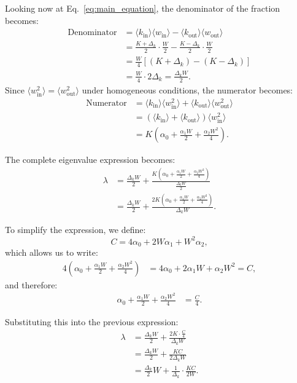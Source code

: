 \documentclass[a4paper,pre,superscriptaddress,floatfix,nofootinbib,twocolumn]{revtex4-1}
\begin{document}
Looking now at Eq.~\eqref{eq:main_equation},
the denominator of the fraction becomes:
\begin{align*}
\text{Denominator} &= \langle k_{\text{in}} \rangle \langle w_\text{in} \rangle - \langle k_{\text{out}} \rangle \langle w_\text{out} \rangle\\
&= \frac{K + \Delta_k}{2} \cdot \frac{W}{2} - \frac{K - \Delta_k}{2} \cdot \frac{W}{2}\\
&= \frac{W}{4}\left[(K + \Delta_k) - (K - \Delta_k)\right]\\
&= \frac{W}{4} \cdot 2\Delta_k = \frac{\Delta_k W}{2}.
\end{align*}
Since $\langle w^2_\text{in} \rangle = \langle w^2_\text{out} \rangle$ under homogeneous conditions, the numerator becomes:
\begin{align*}
\text{Numerator} &= \langle k_{\text{in}} \rangle \langle w^2_\text{in} \rangle + \langle k_{\text{out}} \rangle \langle w^2_\text{out} \rangle\\
&= (\langle k_{\text{in}} \rangle + \langle k_{\text{out}} \rangle) \langle w^2_\text{in} \rangle\\
&= K \left(\alpha_0 + \frac{\alpha_1 W}{2} + \frac{\alpha_2 W^2}{4}\right).
\end{align*}

The complete eigenvalue expression becomes:
\begin{align*}
\lambda &= \frac{\Delta_k W}{2} + \frac{K \left(\alpha_0 + \frac{\alpha_1 W}{2} + \frac{\alpha_2 W^2}{4}\right)}{\frac{\Delta_k W}{2}}\\
&= \frac{\Delta_k W}{2} + \frac{2K \left(\alpha_0 + \frac{\alpha_1 W}{2} + \frac{\alpha_2 W^2}{4}\right)}{\Delta_k W}.
\end{align*}

To simplify the expression, we define:
\begin{equation*}
C = 4\alpha_0 + 2W\alpha_1 + W^2\alpha_2,
\end{equation*}
which allows us to write:
\begin{align*}
4\left(\alpha_0 + \frac{\alpha_1 W}{2} + \frac{\alpha_2 W^2}{4}\right) &= 4\alpha_0 + 2\alpha_1W + \alpha_2W^2 = C,
\end{align*}
and therefore:
\begin{align*}
\alpha_0 + \frac{\alpha_1 W}{2} + \frac{\alpha_2 W^2}{4} &= \frac{C}{4}.
\end{align*}

Substituting this into the previous expression:
\begin{align*}
\lambda &= \frac{\Delta_k W}{2} + \frac{2K \cdot \frac{C}{4}}{\Delta_k W}\\
&= \frac{\Delta_k W}{2} + \frac{KC}{2\Delta_k W}\\
&= \frac{\Delta_k}{2}W + \frac{1}{\Delta_k} \cdot \frac{KC}{2W}.
\end{align*}
\end{document}
